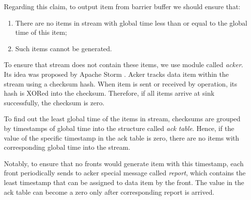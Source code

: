 Regarding this claim, to output item from barrier buffer we should ensure that:
\begin{enumerate}
    \item There are no items in stream with global time less than or equal to the global time of this item;
    \item Such items cannot be generated.
\end{enumerate}

To ensure that stream does not contain these items, we use module called {\it acker}. Its idea was proposed by Apache Storm \cite{apache:storm}. Acker tracks data item within the stream using a checksum hash. When item is sent or received by operation, its hash is XORed into the checksum. Therefore, if all items arrive at sink successfully, the checksum is zero. 

To find out the least global time of the items in stream, checksums are grouped by timestamps of global time into the structure called {\it ack table}. Hence, if the value of the specific timestamp in the ack table is zero, there are no items with corresponding global time into the stream. 

Notably, to ensure that no fronts would generate item with this timestamp, each front periodically sends to acker special message called {\it report}, which contains the least timestamp that can be assigned to data item by the front. The value in the ack table can become a zero only after corresponding report is arrived.  
